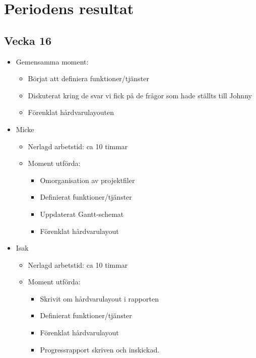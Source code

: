 \section{Periodens resultat}
\subsection*{Vecka 16}

\begin{itemize}[noitemsep]
    \item Gemensamma moment:
    \begin{itemize}[noitemsep]
    	\item Börjat att definiera funktioner/tjänster
        \item Diskuterat kring de svar vi fick på de frågor som hade ställts till Johnny
        \item Förenklat hårdvarulayouten
    \end{itemize}
    \item Micke
    \begin{itemize}[noitemsep]
        \item Nerlagd arbetstid: ca 10 timmar
        \item Moment utförda:
        \begin{itemize}[noitemsep]
            \item Omorganisation av projektfiler
            \item Definierat funktioner/tjänster
            \item Uppdaterat Gantt-schemat
            \item Förenklat hårdvarulayout
		\end{itemize}           
    \end{itemize}
    \item Isak
    \begin{itemize}[noitemsep]
        \item Nerlagd arbetstid: ca 10 timmar
        \item Moment utförda:
        \begin{itemize}[noitemsep]
        	\item Skrivit om hårdvarulayout i rapporten
            \item Definierat funktioner/tjänster
            \item Förenklat hårdvarulayout       
            \item Progressrapport skriven och inskickad.
        \end{itemize}
    \end{itemize}

\end{itemize}
